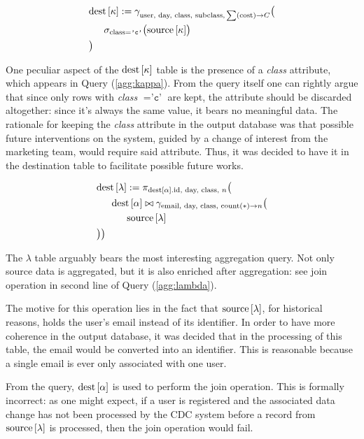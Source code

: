 \begin{align}\label{agg:kappa}
	&\dest{\kappa} := \gamma_{\text{user, day, class, subclass,} \sum(\text{cost}) \rightarrow C} \bigl( \\
	&\ind \sigma_{\text{class} = \texttt{'c'}}\bigl( \source{\kappa} \bigr) \nonumber \\
	&\bigr) \nonumber
\end{align}

One peculiar aspect of the $\text{dest}\left[{\kappa}\right]$ table is the presence of a \emph{class} attribute, which appears in Query (\ref{agg:kappa}).
From the query itself one can rightly argue that since only rows with \emph{class} $= \texttt{'c'}$ are kept, the attribute should be discarded altogether: since it's always the same value, it bears no meaningful data.
The rationale for keeping the \emph{class} attribute in the output database was that possible future interventions on the system, guided by a change of interest from the marketing team, would require said attribute.
Thus, it was decided to have it in the destination table to facilitate possible future works.

\begin{align}\label{agg:lambda}
	&\dest{\lambda} := \pi_{\dest{\alpha}.\text{id} \text{, day, class, } n} \bigl(\\
	&\ind \dest{\alpha} \bowtie \gamma_{\text{email, day, class, count} (*) \rightarrow n} \bigl( \nonumber\\
	&\ind\ind \source{\lambda} \nonumber\\
	&\bigr)\bigr) \nonumber
\end{align}

The $\lambda$ table arguably bears the most interesting aggregation query.
Not only source data is aggregated, but it is also enriched after aggregation: see join operation in second line of Query (\ref{agg:lambda}).

The motive for this operation lies in the fact that $\text{source}\left[{\lambda}\right]$, for historical reasons, holds the user's email instead of its identifier.
In order to have more coherence in the output database, it was decided that in the processing of this table, the email would be converted into an identifier.
This is reasonable because a single email is ever only associated with one user.

From the query, $\text{dest}\left[{\alpha}\right]$ is used to perform the join operation.
This is formally incorrect: as one might expect, if a user is registered and the associated data change has not been processed by the CDC system before a record from $\text{source}\left[{\lambda}\right]$ is processed, then the join operation would fail.

